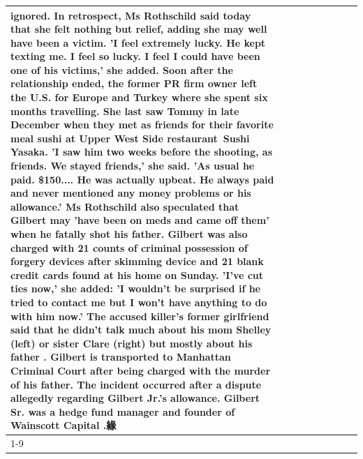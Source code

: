 \begin{table}[H]
\begin{tabular}{lllrlllll}
ignored. In retrospect, Ms Rothschild said today that she felt nothing but relief, adding she may well have been a victim. 'I feel extremely lucky. He kept texting me. I feel so lucky. I feel I could have been one of his victims,' she added. Soon after the relationship ended, the former PR firm owner left the U.S. for Europe and Turkey where she spent six months  travelling. She last saw Tommy in late December when they met as friends for their favorite meal sushi at Upper West Side restaurant Sushi Yasaka. 'I saw him two weeks before the shooting, as friends. We stayed friends,' she said. 'As usual he paid. \$150.... He was actually upbeat. He always paid and never mentioned any money problems or his allowance.' Ms Rothschild also speculated that Gilbert may 'have been on meds and came off them' when he fatally shot his father. Gilbert was also charged with 21 counts of criminal possession of forgery devices after skimming device and 21 blank credit cards found at his home on Sunday. 'I've cut ties now,' she added: 'I wouldn’t be surprised if he tried to contact me but I won’t have anything to do with him now.' The accused killer's former girlfriend said that he didn't talk much about his mom Shelley (left) or sister Clare (right) but mostly about his father . Gilbert is transported to Manhattan Criminal Court  after being charged with the murder of his father. The incident occurred after a dispute allegedly regarding Gilbert Jr.'s allowance. Gilbert Sr. was a hedge fund manager and founder of Wainscott Capital .緣 \\
\cline{1-9}

\end{tabular}
\end{table}
